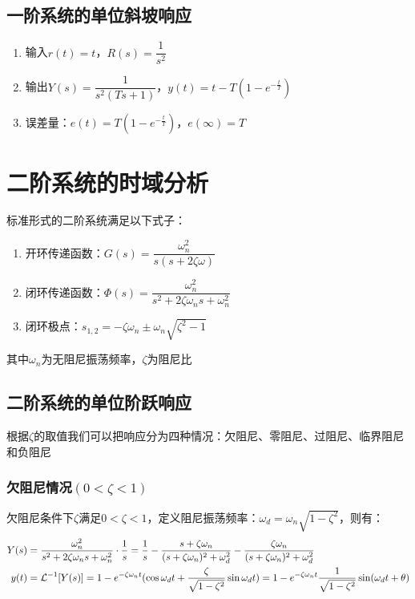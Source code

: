 \subsection{一阶系统的单位斜坡响应}
\begin{enumerate}
    \item 输入$r(t) = t$，$R(s) = \dfrac{1}{s^2}$
    \item 输出$Y(s) = \dfrac{1}{s^2(Ts+1)}$，$y(t) = t-T(1-e^{-\frac{t}{T}})$
    \item 误差量：$e(t) = T(1-e^{-\frac{t}{T}})$，$e(\infty) = T$
\end{enumerate}

\section{二阶系统的时域分析}
\begin{definition}[二阶系统的标准形式]
    标准形式的二阶系统满足以下式子：
    \begin{enumerate}
        \item 开环传递函数：$G(s) = \dfrac{\omega_n^2}{s(s+2\zeta \omega)}$
        \item 闭环传递函数：$\varPhi(s) = \dfrac{\omega_n^2}{s^2 + 2\zeta \omega_n s + \omega_n^2}$
        \item 闭环极点：$s_{1,2} = -\zeta \omega_n \pm \omega_n \sqrt{\zeta^2 -1}$
    \end{enumerate}
    其中$\omega_n$为无阻尼振荡频率，$\zeta$为阻尼比
\end{definition}

\subsection{二阶系统的单位阶跃响应}
根据$\zeta$的取值我们可以把响应分为四种情况：欠阻尼、零阻尼、过阻尼、临界阻尼和负阻尼

\subsubsection{欠阻尼情况$(0<\zeta<1)$}
欠阻尼条件下$\zeta$满足$0<\zeta<1$，定义阻尼振荡频率：$\omega_d = \omega_n\sqrt{1-\zeta^2}$，则有：
\begin{equation*}
    \begin{split}
        Y(s) &= \frac{\omega_n^2}{s^2 + 2\zeta\omega_n s +\omega_n^2}\cdot\frac{1}{s} = \frac{1}{s} - \frac{s+\zeta \omega_n}{(s+\zeta \omega_n)^2+\omega_d^2}-\frac{\zeta\omega_n}{(s+\zeta \omega_n)^2+\omega_d^2} \\
        y(t) &= \mathcal{L}^{-1}[Y(s)] = 1-e^{-\zeta \omega_n t}(\cos \omega_d t +\frac{\zeta}{\sqrt{1-\zeta^2}} \sin \omega_d t) = 1- e^{-\zeta \omega_n t}\frac{1}{\sqrt{1-\zeta^2}}\sin (\omega_d t +\theta)
    \end{split}
\end{equation*}

